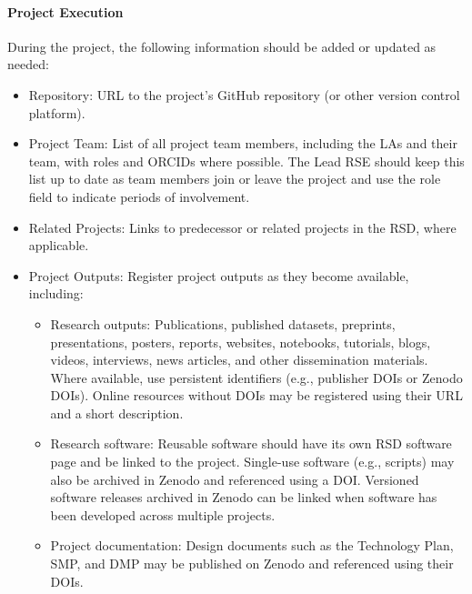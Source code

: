 \paragraph{Project Execution} During the project, the following information should be added or updated as needed:
\begin{itemize}
   \item Repository: URL to the project's GitHub repository (or other version control platform).
   \item Project Team: List of all project team members, including the LAs and their team, with roles and 
   ORCIDs where possible. The Lead RSE should keep this list up to date as team members join or leave the project and 
   use the role field to indicate periods of involvement.
   \item Related Projects: Links to predecessor or related projects in the RSD, where applicable.
   \item Project Outputs: Register project outputs as they become available, including:
   \begin{itemize}
      \item Research outputs: Publications, published datasets, preprints, presentations, posters, reports, 
      websites, notebooks, tutorials, blogs, videos, interviews, news articles, and other dissemination materials. 
      Where available, use persistent identifiers (e.g., publisher DOIs or Zenodo DOIs). Online resources without DOIs 
      may be registered using their URL and a short description.
      \item Research software: Reusable software should have its own RSD software page and be linked to the 
      project. Single-use software (e.g., scripts) may also be archived in Zenodo and referenced using a DOI. Versioned 
      software releases archived in Zenodo can be linked when software has been developed across multiple projects.
      \item Project documentation: Design documents such as the Technology Plan, SMP, and DMP may be published 
      on Zenodo and referenced using their DOIs.
   \end{itemize}
\end{itemize}

